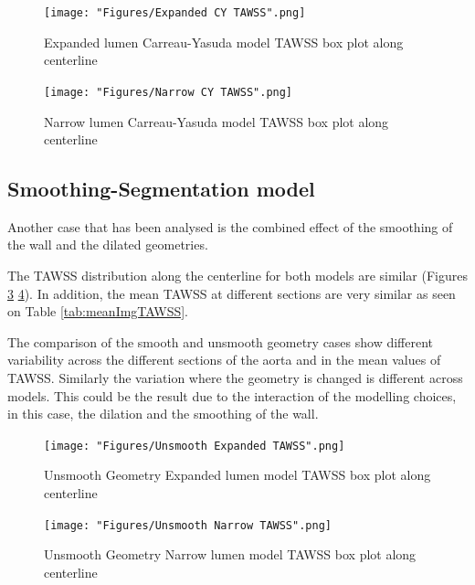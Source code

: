 \begin{figure}[ht!]
    \centering
    \texttt{[image: "Figures/Expanded CY TAWSS".png]}
    \caption{Expanded lumen Carreau-Yasuda model TAWSS box plot along centerline}
    \label{fig:TAWSSCYGeo1}
\end{figure}
\begin{figure}[ht!]
    \centering
    \texttt{[image: "Figures/Narrow CY TAWSS".png]}
    \caption{Narrow lumen Carreau-Yasuda model TAWSS box plot along centerline}
    \label{fig:TAWSSCYGeo2}
\end{figure}


\subsection{Smoothing-Segmentation model}
Another case that has been analysed is the combined effect of the smoothing of the wall and the dilated geometries. \par

The TAWSS distribution along the centerline for both models are similar (Figures \ref{fig:TAWSSImgGeo1} \ref{fig:TAWSSImgGeo2}). In addition, the mean TAWSS at different sections are very similar as seen on Table \ref{tab:meanImgTAWSS}. \par

The comparison of the smooth and unsmooth geometry cases show different variability across the different sections of the aorta and in the mean values of TAWSS. Similarly the variation where the geometry is changed is different across models. This could be the result due to the interaction of the modelling choices, in this case, the dilation and the smoothing of the wall.

\begin{table}[ht!]
\centering
{}
\caption{The mean TAWSS and the standard deviation (SD) of segmentation and smoothing}
\label{tab:meanImgTAWSS}
\end{table}

\begin{figure}[ht!]
    \centering
    \texttt{[image: "Figures/Unsmooth Expanded TAWSS".png]}
    \caption{Unsmooth Geometry Expanded lumen model TAWSS box plot along centerline}
    \label{fig:TAWSSImgGeo1}
\end{figure}
\begin{figure}[ht!]
    \centering
    \texttt{[image: "Figures/Unsmooth Narrow TAWSS".png]}
    \caption{Unsmooth Geometry Narrow lumen model TAWSS box plot along centerline}
    \label{fig:TAWSSImgGeo2}
\end{figure}
